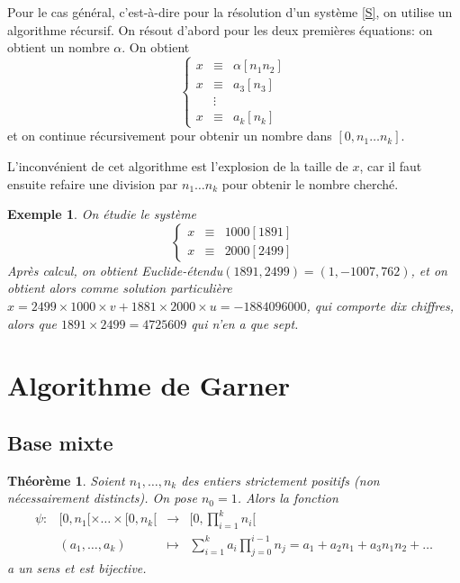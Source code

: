 \documentclass[10pt,a4paper]{report}
\newtheorem{thm}{Théorème}[chapter]
\newtheorem*{ex}{Exemple}
\begin{document}
Pour le cas général, c'est-à-dire pour la résolution d'un système \eqref{S}, on utilise un algorithme récursif. On résout d'abord pour les deux premières équations: on obtient un nombre $\alpha$. On obtient
\begin{equation*}
\left \{ \begin{array}{ccc}
x & \equiv & \alpha [n_1 n_2] \\
x & \equiv & a_3 [n_3] \\
  &      \vdots    &   \\
x & \equiv & a_k [n_k]   
\end{array}   \right.
\end{equation*}
et on continue récursivement pour obtenir un nombre dans $[0, n_1 \ldots n_k]$.\par 
L'inconvénient de cet algorithme est l'explosion de la taille de $x$, car il faut ensuite refaire une division par $n_1 \ldots n_k$ pour obtenir le nombre cherché.

\begin{ex}
On étudie le système
\begin{equation}\label{Ex}
\left \{ \begin{array}{ccc}
x & \equiv &  1000 [1891] \\
x & \equiv & 2000 [2499]
\end{array}   \right.
\end{equation}
Après calcul, on obtient Euclide-étendu$(1891,2499)=(1,-1007,762)$, et on obtient alors comme solution particulière $x = 2499 \times 1000 \times v + 1881 \times 2000 \times u= -1884096000$, qui comporte dix chiffres, alors que $1891 \times 2499= 4725609 $ qui n'en a que sept.
\end{ex}


\section{Algorithme de Garner}

\subsection{Base mixte}


\begin{thm}
Soient $n_1,\ldots, n_k$ des entiers strictement positifs (non nécessairement distincts). On pose $n_0=1$. Alors la fonction 
\begin{equation*}
\begin{array}{cccl}
  \psi:  &  [ 0,n_1 [ \times \ldots \times [0,n_k [ & \longrightarrow  &  \displaystyle  \Big [ 0, \prod_{i=1}^k n_i \Big   [\\
         & (a_1, \ldots , a_k) & \longmapsto & \displaystyle \sum_{ i =1}^{ k }a_i \prod_{j=0}^{ i-1}n_j =a_1+a_2n_1+a_3 n_1 n_2+\ldots
\end{array}
\end{equation*}
a un sens et est bijective.
\end{thm}
\end{document}

